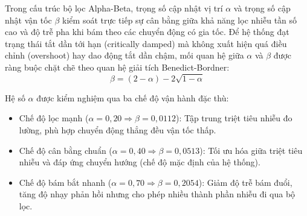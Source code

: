 \hspace{0.5cm} Trong cấu trúc bộ lọc Alpha-Beta, trọng số cập nhật vị trí $\alpha$ và trọng số cập nhật vận tốc $\beta$ kiểm soát trực tiếp sự cân bằng giữa khả năng lọc nhiễu tần số cao và độ trễ pha khi bám theo các chuyển động có gia tốc. Để hệ thống đạt trạng thái tắt dần tới hạn (critically damped) mà không xuất hiện quá điều chỉnh (overshoot) hay dao động tắt dần chậm, mối quan hệ giữa $\alpha$ và $\beta$ được ràng buộc chặt chẽ theo quan hệ giải tích Benedict-Bordner:
\begin{equation}
\beta = (2 - \alpha) - 2\sqrt{1 - \alpha}
\label{eq:benedict-bordner-math}
\end{equation}

Hệ số $\alpha$ được kiểm nghiệm qua ba chế độ vận hành đặc thù:
\begin{itemize}
    \item Chế độ lọc mạnh ($\alpha = 0{,}20 \Rightarrow \beta = 0{,}0112$): Tập trung triệt tiêu nhiễu đo lường, phù hợp chuyển động thẳng đều vận tốc thấp.
    \item Chế độ cân bằng chuẩn ($\alpha = 0{,}40 \Rightarrow \beta = 0{,}0513$): Tối ưu hóa giữa triệt tiêu nhiễu và đáp ứng chuyển hướng (chế độ mặc định của hệ thống).
    \item Chế độ bám bắt nhanh ($\alpha = 0{,}70 \Rightarrow \beta = 0{,}2054$): Giảm độ trễ bám đuổi, tăng độ nhạy phản hồi nhưng cho phép nhiều thành phần nhiễu đi qua bộ lọc.
\end{itemize}

\begin{table}[H]
\centering
\caption{Độ nhạy của RMSE trung bình và độ lệch chuẩn theo tham số $\alpha$ (Người đi bộ, 10 seed)}
\label{tab:alpha-sweep-results}
\end{table}

